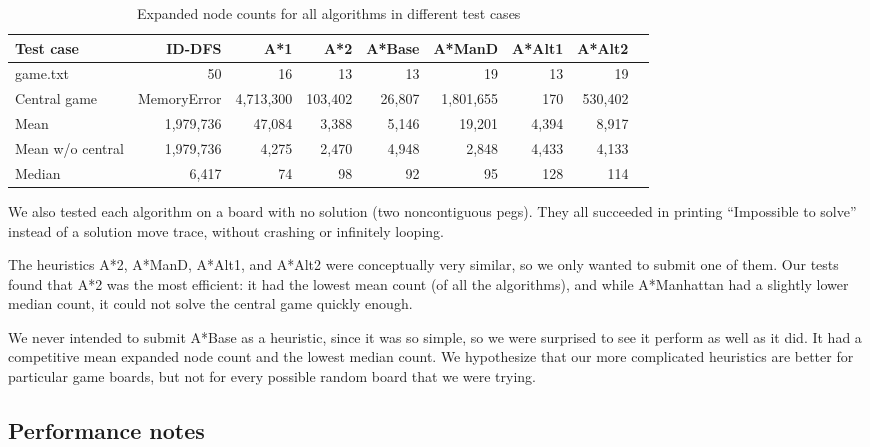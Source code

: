 \documentclass[11pt]{article}
\begin{document}
\begin{table}[h!]
\centering
\begin{tabular}{| l | r | r | r | r | r | r | r | r |}
\hline
\textbf{Test case} & \textbf{ID-DFS} & \textbf{A*1} & \textbf{A*2} &
	\textbf{A*Base} & \textbf{A*ManD} & \textbf{A*Alt1} & \textbf{A*Alt2} \\
\hline
game.txt & 50 & 16 & 13 & 13 & 19 & 13 & 19 \\
\hline
Central game & MemoryError & 4,713,300 & 103,402 & 26,807 & 1,801,655 & 170 & 530,402 \\
\hline
Mean & 1,979,736 & 47,084 & 3,388 & 5,146 & 19,201 & 4,394 & 8,917 \\
\hline
Mean w/o central & 1,979,736 & 4,275 & 2,470 & 4,948 & 2,848 & 4,433 & 4,133 \\
\hline
Median & 6,417 & 74 & 98 & 92 & 95 & 128 & 114 \\
\hline
\end{tabular}
\caption{Expanded node counts for all algorithms in different test cases}
\label{tab_perf}
\end{table}

We also tested each algorithm on a board with no solution (two noncontiguous pegs).
They all succeeded in printing ``Impossible to solve'' instead of a solution move
trace, without crashing or infinitely looping.

The heuristics A*2, A*ManD, A*Alt1, and A*Alt2 were conceptually very
similar, so we only wanted to submit one of them. Our tests found that A*2 was
the most efficient: it had the lowest mean count (of all the algorithms), and
while A*Manhattan had a slightly lower median count, it could not solve the
central game quickly enough.

We never intended to submit A*Base as a heuristic, since it was so simple, so we
were surprised to see it perform as well as it did. It had a competitive mean
expanded node count and the lowest median count. We hypothesize that our more
complicated heuristics are better for particular game boards, but not for every
possible random board that we were trying.

\subsection{Performance notes}
\end{document}

